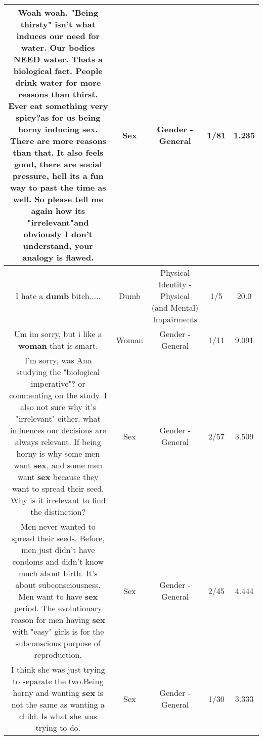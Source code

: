 \documentclass[11pt]{article}
\newlength\mylength
\begin{document}
\begin{center}
\begin{longtable}{|C{.65\mylength}|C{.30\mylength}|C{.12\mylength}|C{.12\mylength}|C{.12\mylength}|}
  \small Woah woah. "Being thirsty" isn't what induces our need for water. Our bodies NEED water. Thats a biological fact. People drink water for more reasons than thirst. Ever eat something very spicy?as for us being horny inducing \textbf{sex}. There are more reasons than that. It also feels good, there are social pressure, hell its a fun way to past the time as well. So please tell me again how its "irrelevant"and obviously I don't understand, your analogy is flawed.\normalsize   & Sex & Gender - General & 1/81 & 1.235 \\  \hline
  \small I hate a \textbf{dumb} bitch.....\normalsize   & Dumb & Physical Identity - Physical (and Mental) Impairments & 1/5 & 20.0 \\  \hline
  \small Um im sorry, but i like a \textbf{woman} that is smart.\normalsize   & Woman & Gender - General & 1/11 & 9.091 \\  \hline
  \small I'm sorry, was Ana studying the "biological imperative"? or commenting on the study. I also not sure why it's "irrelevant" either. what influences our decisions are always relevant. If being horny is why some men want \textbf{sex}, and some men want \textbf{sex} because they want to spread their seed. Why is it irrelevant to find the distinction?\normalsize   & Sex & Gender - General & 2/57 & 3.509 \\  \hline
  \small Men never wanted to spread their seeds. Before, men just didn't have condoms and didn't know much about birth. It's about subconsciousness. Men want to have \textbf{sex} period. The evolutionary reason for men having \textbf{sex} with "easy" girls is for the subconscious purpose of reproduction.\normalsize   & Sex & Gender - General & 2/45 & 4.444 \\  \hline
  \small I think she was just trying to separate the two.Being horny and wanting \textbf{sex} is not the same as wanting a child. Is what she was trying to do.\normalsize   & Sex & Gender - General & 1/30 & 3.333 \\  \hline

\end{longtable}
\end{center}
\end{document}
